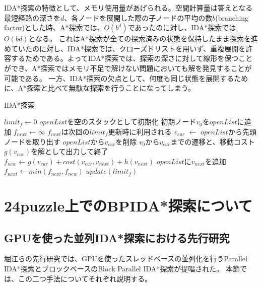 \documentclass[a4paper,11pt,oneside,openany]{jsbook}
\begin{document}
IDA*探索の特徴として、メモリ使用量があげられる。空間計算量は答えとなる最短経路の深さを$d$、各ノードを展開した際の子ノードの平均の数$b$(branching factor)とした時、A*探索では、$O(b^d)$であったのに対し、IDA*探索では$O(bd)$となる。
これはA*探索が全ての探索済みの状態を保持したまま探索を進めていたのに対し、IDA*探索では、クローズドリストを用いず、重複展開を許容するためである。よってIDA*探索では、探索の深さに対して線形を保つことができ、A*探索ではメモリ不足で解けない問題においても解を発見することが可能である。
一方、IDA*探索の欠点として、何度も同じ状態を展開するために、A*探索と比べて無駄な探索を行うことになってしまう。

\newpage
\begin{algorithm}
\caption{IDA*探索}
\label{alg:pbnf}
\begin{algorithmic}[1]
\State $limit_f \leftarrow 0$
    \State $openList$を空のスタックとして初期化
    \State 初期ノード$v_0$を$openList$に追加
    \State $f_{next} \leftarrow \infty$
    \State $f_{next}$は次回の$limit_f$更新時に利用される 
        \State $v_{cur}$ $\leftarrow$ $openList$から先頭ノードを取り出す
        \State $openList$から$v_{cur}$を削除
            \State $v_0$から$v_{cur}$までの遷移と、移動コスト$g(v_{cur})$を解として出力して終了
        \EndIf
            \State $f_{new} \leftarrow g(v_{cur}) + cost(v_{cur}, v_{next}) + h(v_{next})$
                \State $openList$に$v_{next}$を追加
            \Else
                \State $f_{next} \leftarrow min(f_{next}, f_{new})$
            \EndIf
        \EndFor
    \EndWhile
    \State $update(limit_f)$
\EndWhile
\end{algorithmic}
\end{algorithm}
\newpage



\chapter{24puzzle上でのBPIDA*探索について}
\section{GPUを使った並列IDA*探索における先行研究}
堀江らの先行研究\cite{HA17}では、GPUを使ったスレッドベースの並列化を行うParallel IDA*探索とブロックベースのBlock Parallel IDA*探索が提唱された。
本節では、この二つ手法についてそれぞれ説明する。
\end{document}
